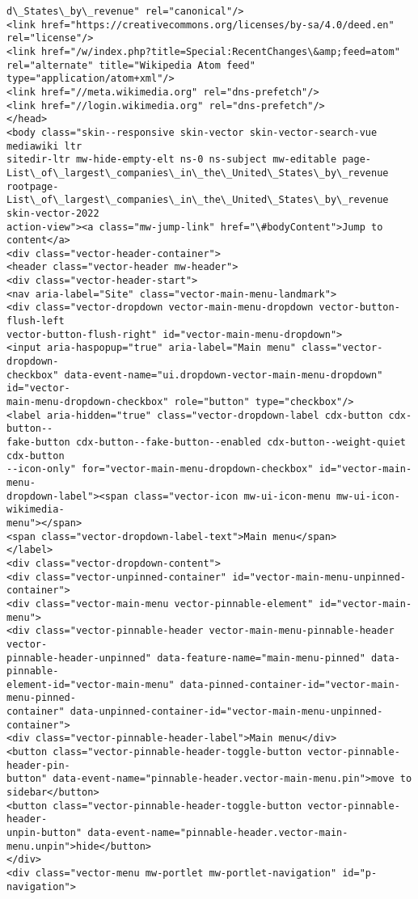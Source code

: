 \documentclass[11pt]{article}
\begin{document}
\begin{Verbatim}[commandchars=\\\{\}]
d\_States\_by\_revenue" rel="canonical"/>
<link href="https://creativecommons.org/licenses/by-sa/4.0/deed.en"
rel="license"/>
<link href="/w/index.php?title=Special:RecentChanges\&amp;feed=atom"
rel="alternate" title="Wikipedia Atom feed" type="application/atom+xml"/>
<link href="//meta.wikimedia.org" rel="dns-prefetch"/>
<link href="//login.wikimedia.org" rel="dns-prefetch"/>
</head>
<body class="skin--responsive skin-vector skin-vector-search-vue mediawiki ltr
sitedir-ltr mw-hide-empty-elt ns-0 ns-subject mw-editable page-
List\_of\_largest\_companies\_in\_the\_United\_States\_by\_revenue rootpage-
List\_of\_largest\_companies\_in\_the\_United\_States\_by\_revenue skin-vector-2022
action-view"><a class="mw-jump-link" href="\#bodyContent">Jump to content</a>
<div class="vector-header-container">
<header class="vector-header mw-header">
<div class="vector-header-start">
<nav aria-label="Site" class="vector-main-menu-landmark">
<div class="vector-dropdown vector-main-menu-dropdown vector-button-flush-left
vector-button-flush-right" id="vector-main-menu-dropdown">
<input aria-haspopup="true" aria-label="Main menu" class="vector-dropdown-
checkbox" data-event-name="ui.dropdown-vector-main-menu-dropdown" id="vector-
main-menu-dropdown-checkbox" role="button" type="checkbox"/>
<label aria-hidden="true" class="vector-dropdown-label cdx-button cdx-button--
fake-button cdx-button--fake-button--enabled cdx-button--weight-quiet cdx-button
--icon-only" for="vector-main-menu-dropdown-checkbox" id="vector-main-menu-
dropdown-label"><span class="vector-icon mw-ui-icon-menu mw-ui-icon-wikimedia-
menu"></span>
<span class="vector-dropdown-label-text">Main menu</span>
</label>
<div class="vector-dropdown-content">
<div class="vector-unpinned-container" id="vector-main-menu-unpinned-container">
<div class="vector-main-menu vector-pinnable-element" id="vector-main-menu">
<div class="vector-pinnable-header vector-main-menu-pinnable-header vector-
pinnable-header-unpinned" data-feature-name="main-menu-pinned" data-pinnable-
element-id="vector-main-menu" data-pinned-container-id="vector-main-menu-pinned-
container" data-unpinned-container-id="vector-main-menu-unpinned-container">
<div class="vector-pinnable-header-label">Main menu</div>
<button class="vector-pinnable-header-toggle-button vector-pinnable-header-pin-
button" data-event-name="pinnable-header.vector-main-menu.pin">move to
sidebar</button>
<button class="vector-pinnable-header-toggle-button vector-pinnable-header-
unpin-button" data-event-name="pinnable-header.vector-main-
menu.unpin">hide</button>
</div>
<div class="vector-menu mw-portlet mw-portlet-navigation" id="p-navigation">

\end{Verbatim}
\end{document}
